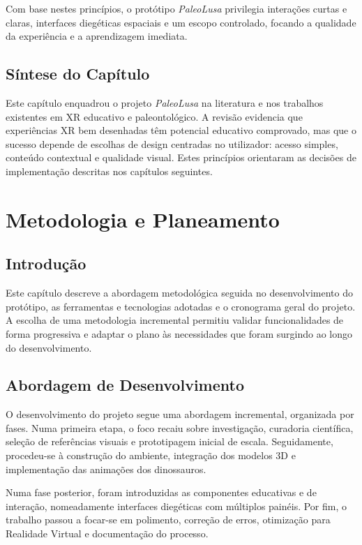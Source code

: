 \documentclass[a4paper,11pt]{report}
\newcommand{\blankpage}{%
    \newpage
    \thispagestyle{empty}
    \mbox{}
    \newpage
}
\begin{document}
Com base nestes princípios, o protótipo \textit{PaleoLusa} privilegia
interações curtas e claras, interfaces diegéticas espaciais e um escopo
controlado, focando a qualidade da experiência e a aprendizagem imediata.

\section{Síntese do Capítulo}

Este capítulo enquadrou o projeto \textit{PaleoLusa} na literatura e nos
trabalhos existentes em XR educativo e paleontológico. A revisão evidencia
que experiências XR bem desenhadas têm potencial educativo comprovado, mas
que o sucesso depende de escolhas de design centradas no utilizador: acesso
simples, conteúdo contextual e qualidade visual. Estes princípios orientaram
as decisões de implementação descritas nos capítulos seguintes.

\blankpage

\chapter{Metodologia e Planeamento}

\section{Introdução}

Este capítulo descreve a abordagem metodológica seguida no desenvolvimento
do protótipo, as ferramentas e tecnologias adotadas e o cronograma geral
do projeto. A escolha de uma metodologia incremental permitiu validar
funcionalidades de forma progressiva e adaptar o plano às necessidades
que foram surgindo ao longo do desenvolvimento.

\section{Abordagem de Desenvolvimento}

O desenvolvimento do projeto segue uma abordagem incremental, organizada por
fases. Numa primeira etapa, o foco recaiu sobre investigação, curadoria
científica, seleção de referências visuais e prototipagem inicial de escala.
Seguidamente, procedeu-se à construção do ambiente, integração dos modelos 3D
e implementação das animações dos dinossauros.

Numa fase posterior, foram introduzidas as componentes educativas e de
interação, nomeadamente interfaces diegéticas com múltiplos painéis. Por fim,
o trabalho passou a focar-se em polimento, correção de erros, otimização para
Realidade Virtual e documentação do processo.
\end{document}
